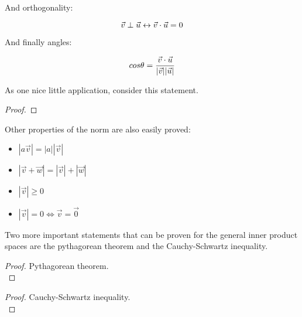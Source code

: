And orthogonality:

$$ \vec{v} \perp \vec{u} \leftrightarrow \vec{v} \cdot \vec{u} = 0$$

And finally angles: 

$$ cos\theta = \frac{\vec{v} \cdot \vec{u}}{|\vec{v}||\vec{u}|}$$



As one nice little application, consider this statement. 
\begin{proof}
\end{proof}

Other properties of the norm are also easily proved:

\begin{itemize}
    \item $|a\vec{v}| = |a||\vec{v}|$
    \item $|\vec{v} + \vec{w}| = |\vec{v}| + |\vec{w}|$
    \item $|\vec{v}| \geq 0$
    \item $|\vec{v}| = 0 \iff \vec{v} = \vec{0}$
\end{itemize}

Two more important statements that can be proven for the general inner product spaces are the pythagorean theorem and the Cauchy-Schwartz inequality. 

\begin{proof}
    Pythagorean theorem.\\
\end{proof}


\begin{proof}
    Cauchy-Schwartz inequality.\\
\end{proof}


